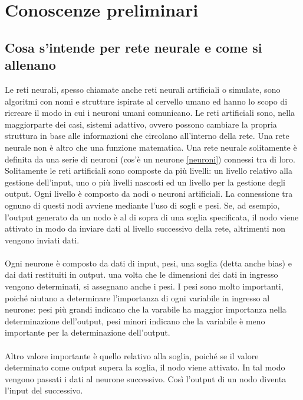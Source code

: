 \chapter{Conoscenze preliminari}
\label{ch:Conoscenze Preliminari}
\section{Cosa s'intende per rete neurale e come si allenano}
Le reti neurali, spesso chiamate anche reti neurali artificiali o simulate, sono algoritmi con nomi e strutture 
ispirate al cervello umano ed hanno lo scopo di ricreare il modo in cui i neuroni umani comunicano.
Le reti artificiali sono, nella maggiorparte dei casi, sistemi adattivo, ovvero possono cambiare
la propria struttura in base alle informazioni che circolano all'interno della rete.
Una rete neurale non è altro che una funzione matematica. Una rete neurale solitamente è definita 
da una serie di neuroni (cos'è un neurone \ref{neuroni}) connessi tra di loro.
Solitamente le reti artificiali sono composte da più livelli: un livello relativo alla gestione dell'input,
uno o più livelli nascosti ed un livello per la gestione degli output.
Ogni livello è composto da nodi o neuroni artificiali.
La connessione tra ognuno di questi nodi avviene mediante l'uso di sogli e pesi. Se, ad esempio, 
l'output generato da un nodo è al di sopra di una soglia specificata, il nodo viene attivato in modo 
da inviare dati al livello successivo della rete, altrimenti non vengono inviati dati.
\\\\
Ogni neurone è composto da dati di input, pesi, una soglia (detta anche bias) e dai dati restituiti in output.
una volta che le dimensioni dei dati in ingresso vengono determinati, si assegnano anche i pesi.
I pesi sono molto importanti, poiché aiutano a determinare l'importanza di ogni variabile in ingresso 
al neurone: pesi più grandi indicano che la varabile ha maggior importanza nella determinazione dell'output,
pesi minori indicano che la variabile è meno importante per la determinazione dell'output.
\\\\
Altro valore importante è quello relativo alla soglia, poiché se il valore determinato come output supera la soglia, 
il nodo viene attivato. In tal modo vengono passati i dati al neurone successivo.
Così l'output di un nodo diventa l'input del successivo.
\\\\
